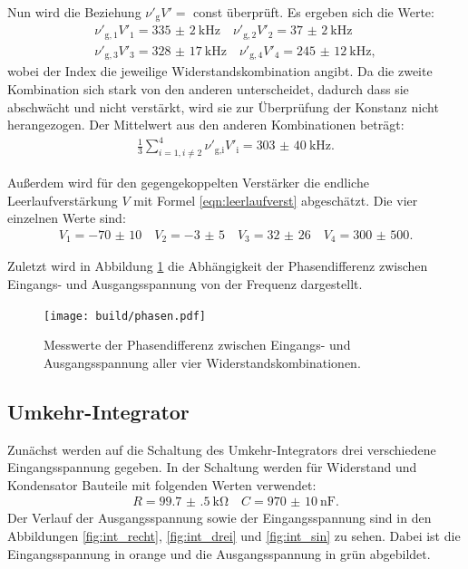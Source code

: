 Nun wird die Beziehung $\nu'_\text{g} V'=$ const überprüft. Es ergeben sich die Werte:
\begin{align*}
  \nu'_{\text{g}, 1} V'_1 = \SI{335(2)}{\kilo\hertz} \quad \nu'_{\text{g}, 2} V'_2 = \SI{37(2)}{\kilo\hertz}\\ \nu'_{\text{g}, 3} V'_3 = \SI{328(17)}{\kilo\hertz} \quad \nu'_{\text{g}, 4} V'_4 = \SI{245(12)}{\kilo\hertz},
\end{align*}
wobei der Index die jeweilige Widerstandskombination angibt. Da die zweite Kombination sich stark von den anderen unterscheidet, dadurch dass sie abschwächt und nicht verstärkt, wird sie zur Überprüfung der Konstanz nicht herangezogen.
Der Mittelwert aus den anderen Kombinationen beträgt:
\begin{align*}
  \frac{1}{3}\sum_{i=1, i\neq2}^4 \nu'_{\text{g}, \text{i}} V'_\text{i} = \SI{303(40)}{\kilo\hertz}.
\end{align*}

Außerdem wird für den gegengekoppelten Verstärker die endliche Leerlaufverstärkung $V$ mit Formel \eqref{eqn:leerlaufverst} abgeschätzt. Die vier einzelnen Werte sind:
\begin{align*}
  V_1 = \num{-70(10)} \quad V_2 = \num{-3(5)} \quad V_3 = \num{32(26)} \quad V_4 = \num{300(500)}.
\end{align*}

Zuletzt wird in Abbildung \ref{fig:phase} die Abhängigkeit der Phasendifferenz zwischen Eingangs- und Ausgangsspannung von der Frequenz dargestellt.

\begin{figure}
  \centering
  \texttt{[image: build/phasen.pdf]}
  \caption{Messwerte der Phasendifferenz zwischen Eingangs- und Ausgangsspannung aller vier Widerstandskombinationen.}
  \label{fig:phase}
\end{figure}

\subsection{Umkehr-Integrator}

Zunächst werden auf die Schaltung des Umkehr-Integrators drei verschiedene Eingangsspannung gegeben.
In der Schaltung werden für Widerstand und Kondensator Bauteile mit folgenden  Werten verwendet:
\begin{align*}
  R = \SI{99.7(5)}{\kilo\ohm} \quad C = \SI{970(10)}{\nano\farad}.
\end{align*}
Der Verlauf der Ausgangsspannung sowie der Eingangsspannung sind in den Abbildungen \ref{fig:int_recht}, \ref{fig:int_drei} und \ref{fig:int_sin} zu sehen. Dabei ist die Eingangsspannung in orange und die Ausgangsspannung in grün abgebildet.

